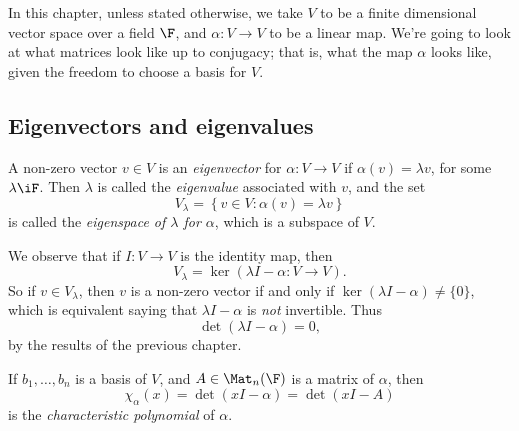\setcounter{lecture}{3}

In this chapter, unless stated otherwise, we take $V$ to be a finite dimensional vector space over a field $\F$, and $\alpha:V\to V$ to be a linear map. We're going to look at what matrices look like up to conjugacy; that is, what the map $\alpha$ looks like, given the freedom to choose a basis for $V$.

% 

\subsection{Eigenvectors and eigenvalues} %
\label{sub:eigenvectors_and_eigenvalues}

\begin{definition}
	A non-zero vector $v\in V$ is an \emph{eigenvector} for $\alpha:V\to V$ if $\alpha(v)=\lambda v$, for some $\lambda\iF$. Then $\lambda$ is called the \emph{eigenvalue} associated with $v$, and the set %
	\begin{equation*}
		V_\lambda = \left\{v\in V:\alpha(v)=\lambda v\right\}
	\end{equation*}
	is called the \emph{eigenspace of $\lambda$ for $\alpha$}, which is a subspace of $V$.
\end{definition}

We observe that if $I : V \to V$ is the identity map, then
\begin{equation*}
	V_\lambda = \ker(\lambda I-\alpha:V\to V).
\end{equation*}
So if $v\in V_\lambda$, then $v$ is a non-zero vector if and only if $\ker(\lambda I-\alpha)\neq \{0\}$, which is equivalent saying that $\lambda I-\alpha$ is \emph{not} invertible. Thus
\begin{equation*}
	\det(\lambda I-\alpha) = 0,
\end{equation*}
by the results of the previous chapter.

\begin{definition}
	If $b_1,\ldots,b_n$ is a basis of $V$, and $A\in\Mat_n(\F)$ is a matrix of $\alpha$, then %
	\begin{equation*}
		\chi_\alpha(x) = \det(xI-\alpha) = \det(xI-A)
	\end{equation*}
	is the \emph{characteristic polynomial} of $\alpha$.
\end{definition}

